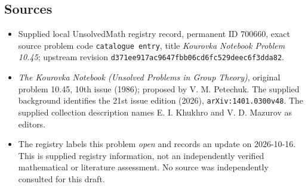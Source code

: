 \documentclass[11pt]{article}
\begin{document}
\subsection{Sources}
\begin{itemize}
\item Supplied local UnsolvedMath registry record, permanent ID \(700660\), exact source problem code \texttt{catalogue entry}, title \emph{Kourovka Notebook Problem 10.45}; upstream revision \texttt{d371ee917ac9647fbb06cd6fc529deec6f3dda82}.
\item \emph{The Kourovka Notebook (Unsolved Problems in Group Theory)}, original problem 10.45, 10th issue (1986); proposed by V. M. Petechuk. The supplied background identifies the 21st issue edition (2026), \texttt{arXiv:1401.0300v48}. The supplied collection description names E. I. Khukhro and V. D. Mazurov as editors.
\item The registry labels this problem \emph{open} and records an update on 2026-10-16. This is supplied registry information, not an independently verified mathematical or literature assessment. No source was independently consulted for this draft.
\end{itemize}
\end{document}
